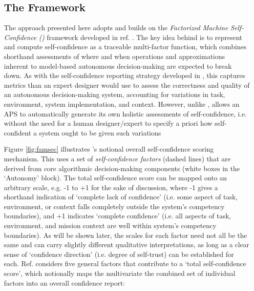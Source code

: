     \subsection{The \famsec{} Framework }
    The approach presented here adopts and builds on the \emph{Factorized Machine Self-Confidence (\famsec)} framework developed in ref. \cite{Aitken2016-cv,Aitken2016-fb}. The key idea behind \famsec{} is to represent and compute self-confidence as a traceable multi-factor function, which combines shorthand assessments of where and when operations and approximations inherent to model-based autonomous decision-making are expected to break down. As with the self-confidence reporting strategy developed in \cite{Hutchins2015-if}, this captures metrics than an expert designer would use to assess the correctness and quality of an autonomous decision-making system, accounting for variations in task, environment, system implementation, and context. However, unlike \cite{Hutchins2015-if}, \famsec{} allows an APS to automatically generate its own holistic assessments of self-confidence, i.e. without the need for a human designer/expert to specify a priori how self-confident a system ought to be given such variations %
    
    Figure \ref{fig:famsec} illustrates \famsec's notional overall self-confidence scoring mechanism. This uses a set of \emph{self-confidence factors} (dashed lines) that are derived from core algorithmic decision-making components (white boxes in the `Autonomy' block). The total self-confidence score can be mapped onto an arbitrary scale, e.g. -1 to +1 for the sake of discussion, where -1 gives a shorthand indication of `complete lack of confidence' (i.e. some aspect of task, environment, or context falls completely outside the system's competency boundaries), and +1 indicates `complete confidence' (i.e. all aspects of task, environment, and mission context are well within system's competency boundaries). As will be shown later, the scales for each factor need not all be the same and can carry slightly different qualitative interpretations, as long as a clear sense of `confidence direction' (i.e. degree of self-trust) can be established for each. 
    Ref. \cite{Aitken2016-cv} considers five general factors that contribute to a `total self-confidence score', which notionally maps the multivariate the combined set of individual factors into an overall confidence report:
    
